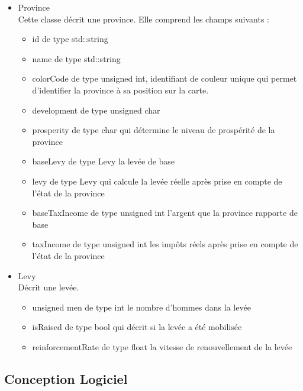 \documentclass[a4paper,12pt]{article}
\begin{document}
\begin{itemize}
\item Province\\
Cette classe décrit une province. Elle comprend les champs suivants :
\begin{itemize}
\item id de type std::string
\item name de type std::string
\item colorCode de type unsigned int, identifiant de couleur unique qui permet d'identifier la province à sa position sur la carte.
\item development de type unsigned char
\item prosperity de type char qui détermine le niveau de prospérité de la province
\item baseLevy de type Levy la levée de base
\item levy de type Levy qui calcule la levée réelle après prise en compte de l'état de la province
\item baseTaxIncome de type unsigned int l'argent que la province rapporte de base
\item taxIncome de type unsigned int les impôts réels après prise en compte de l'état de la province
\end{itemize}
\item Levy\\
Décrit une levée.
\begin{itemize}
\item unsigned men de type int le nombre d'hommes dans la levée
\item isRaised de type bool qui décrit si la levée a été mobilisée
\item reinforcementRate de type float la vitesse de renouvellement de la levée
\end{itemize}
\end{itemize}

\subsection{Conception Logiciel}
\end{document}
